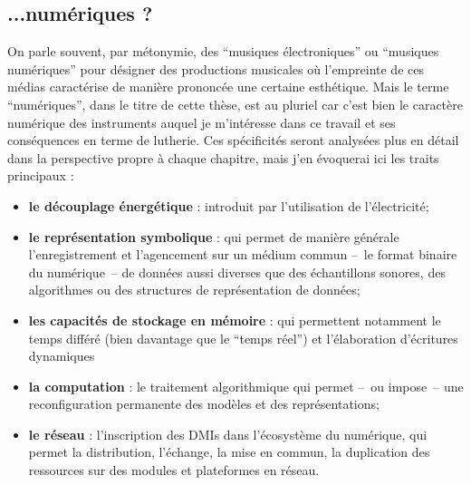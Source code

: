 \subsection*{...numériques ?}

\indent On parle souvent, par métonymie, des ``musiques électroniques'' ou ``musiques numériques'' pour désigner des productions musicales où l'empreinte de ces médias caractérise de manière prononcée une certaine esthétique. Mais le terme ``numériques'', dans le titre de cette thèse, est au pluriel car c'est bien le caractère numérique des instruments auquel je m'intéresse dans ce travail et ses conséquences en terme de lutherie. Ces spécificités seront analysées plus en détail dans la perspective propre à chaque chapitre, mais j'en évoquerai ici les traits principaux :
\vspace{-1em}
\begin{itemize}[noitemsep]
\item \textbf{le découplage énergétique} : introduit par l'utilisation de l'électricité;
\item \textbf{le représentation symbolique} : qui permet de manière générale l'enregistrement et l'agencement sur un médium commun --~le format binaire du numérique~-- de données aussi diverses que des échantillons sonores, des algorithmes ou des structures de représentation de données;
\item \textbf{les capacités de stockage en mémoire} : qui permettent notamment le temps différé (bien davantage que le ``temps réel'') et l'élaboration d'écritures dynamiques 
\item \textbf{la computation} : le traitement algorithmique qui permet --~ou impose~-- une reconfiguration permanente des modèles et des représentations;
\item \textbf{le réseau} : l'inscription des \glspl{DMI} dans l'écosystème du numérique, qui permet la distribution, l'échange, la mise en commun, la duplication des ressources sur des modules et plateformes en réseau.
\end{itemize}

